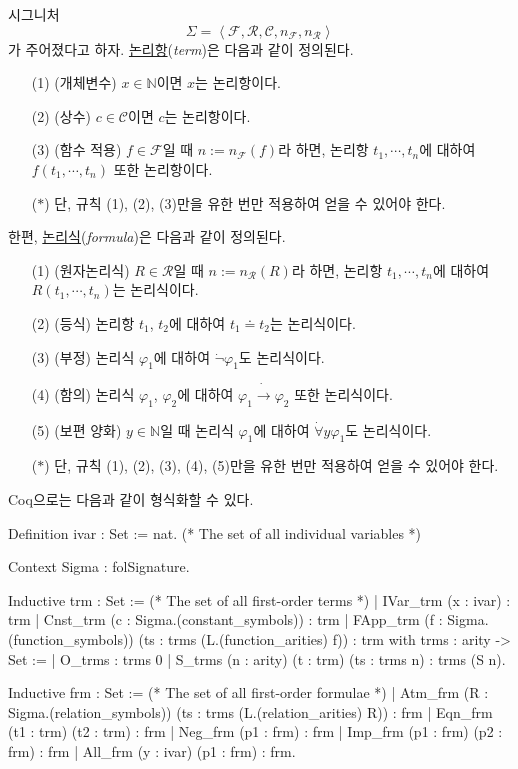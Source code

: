 \documentclass[12pt]{paper}
\begin{document}
시그니처 $$\Sigma = \left\langle \mathcal{F}, \mathcal{R}, \mathcal{C}, n_\mathcal{F} , n_\mathcal{R} \right\rangle$$가 주어졌다고 하자.
\underline{논리항}(\textit{term})은 다음과 같이 정의된다.
\begin{enumerate}
\item [(1)] (개체변수) $x \in \mathbb{N}$이면 $x$는 논리항이다.
\item [(2)] (상수) $c \in \mathcal{C}$이면 $c$는 논리항이다.
\item [(3)] (함수 적용) $f \in \mathcal{F}$일 때 $n := n_\mathcal{F} \left( f \right)$라 하면, 논리항 $t_1, \cdots , t_n$에 대하여 $f \left( t_1 , \cdots , t_n \right)$ 또한 논리항이다.
\item [($\ast$)] 단, 규칙 (1), (2), (3)만을 유한 번만 적용하여 얻을 수 있어야 한다.
\end{enumerate}
한편, \underline{논리식}(\textit{formula})은 다음과 같이 정의된다.
\begin{enumerate}
\item [(1)] (원자논리식) $R \in \mathcal{R}$일 때 $n := n_\mathcal{R} \left( R \right)$라 하면, 논리항 $t_1, \cdots , t_n$에 대하여 $R \left( t_1 , \cdots , t_n \right)$는 논리식이다.
\item [(2)] (등식) 논리항 $t_1$, $t_2$에 대하여 $t_1 \doteq t_2$는 논리식이다. 
\item [(3)] (부정) 논리식 $\varphi_1$에 대하여 $\dot\lnot \varphi_1$도 논리식이다.
\item [(4)] (함의) 논리식 $\varphi_1$, $\varphi_2$에 대하여 $\varphi_1 \dot\to \varphi_2$ 또한 논리식이다.
\item [(5)] (보편 양화) $y \in \mathbb{N}$일 때 논리식 $\varphi_1$에 대하여 $\dot\forall y \varphi_1$도 논리식이다.
\item [($\ast$)] 단, 규칙 (1), (2), (3), (4), (5)만을 유한 번만 적용하여 얻을 수 있어야 한다.
\end{enumerate}
Coq으로는 다음과 같이 형식화할 수 있다.
\begin{coqcode}
Definition ivar : Set := nat. (* The set of all individual variables *)

Context {Sigma : folSignature}.

Inductive trm : Set := (* The set of all first-order terms *)
  | IVar_trm (x : ivar) : trm
  | Cnst_trm (c : Sigma.(constant_symbols)) : trm
  | FApp_trm (f : Sigma.(function_symbols)) (ts : trms (L.(function_arities) f)) : trm
with trms : arity -> Set :=
  | O_trms : trms 0
  | S_trms (n : arity) (t : trm) (ts : trms n) : trms (S n).

Inductive frm : Set := (* The set of all first-order formulae *)
  | Atm_frm (R : Sigma.(relation_symbols)) (ts : trms (L.(relation_arities) R)) : frm
  | Eqn_frm (t1 : trm) (t2 : trm) : frm
  | Neg_frm (p1 : frm) : frm
  | Imp_frm (p1 : frm) (p2 : frm) : frm
  | All_frm (y : ivar) (p1 : frm) : frm.
\end{coqcode}
\end{document}
